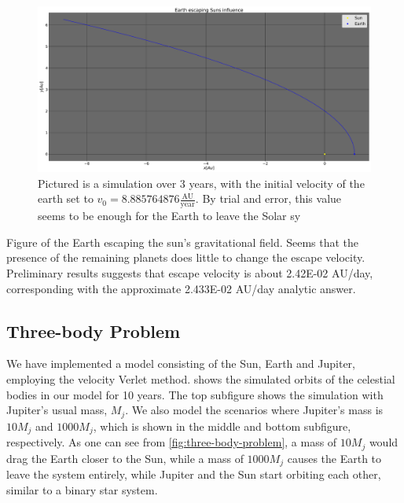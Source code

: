 \documentclass[../main.tex]{subfiles}
\begin{document}
\begin{figure}[htb!]
    \centering
    \includegraphics[trim=5.cm 0.cm 0.cm 0.cm, clip,width=\textwidth]{../figures/escape.pdf}
    \caption{Pictured is a simulation over 3 years, with the initial velocity of the earth set to $v_0 = 8.885764876 \frac{\text{AU}}{\text{year}}$. By trial and error, this value seems to be enough for the Earth to leave the Solar sy}
    \label{fig:earth-escape-velocity}
\end{figure}

Figure of the Earth escaping the sun's gravitational field. Seems that the presence of the remaining planets does little to change the escape velocity. Preliminary results suggests that escape velocity is about 2.42E-02 AU/day, corresponding with the approximate 2.433E-02 AU/day analytic answer.

\subsection{Three-body Problem}
We have implemented a model consisting of the Sun, Earth and Jupiter, employing the velocity Verlet method.  shows the simulated orbits of the celestial bodies in our model for 10 years. The top subfigure shows the simulation with Jupiter's usual mass, $M_j$. We also model the scenarios where Jupiter's mass is $10M_j$ and $1000M_j$, which is shown in the middle and bottom subfigure, respectively. As one can see from \cref{fig:three-body-problem}, a mass of $10M_j$ would drag the Earth closer to the Sun, while a mass of $1000M_j$ causes the Earth to leave the system entirely, while Jupiter and the Sun start orbiting each other, similar to a binary star system. 
\end{document}
